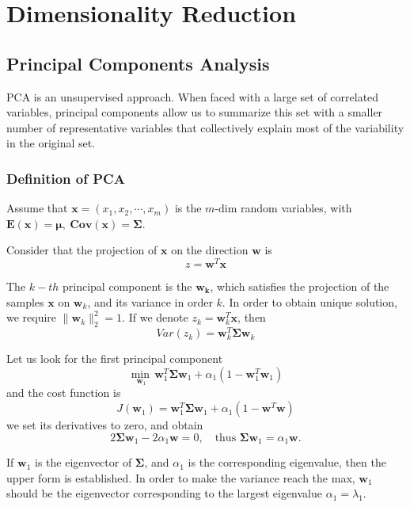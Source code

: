 \chapter{Dimensionality Reduction}




\newpage
\section{Principal Components Analysis}
PCA is an unsupervised approach. When faced with a large set of correlated variables, principal components allow us to summarize this set with a smaller number of representative variables that collectively explain most of the variability in the original set.

\subsection{Definition of PCA}
Assume that $\mathbf{x} = (x_1,x_2,\cdots,x_m)$ is the $m$-dim random variables, with $\mathbf{E}(\mathbf{x}) = \mathbf{\mu},~\mathbf{Cov}(\mathbf{x}) = \mathbf{\Sigma}$. 

Consider that the projection of $\mathbf{x}$ on the direction $\mathbf{w}$ is
\[
	z = \mathbf{w}^T \mathbf{x}
\]

The $k-th$ principal component is the $\mathbf{w_k}$, which satisfies the projection of the samples $\mathbf{x}$ on $\mathbf{w}_k$, and its variance in order $k$. In order to obtain unique solution, we require $\|\mathbf{w}_k\|_2^2 = 1$. If we denote $z_k = \mathbf{w}_k^T\mathbf{x}$, then
\[
	Var(z_k) = \mathbf{w}_k^T \mathbf{\Sigma} \mathbf{w}_k
\]

Let us look for the first principal component
\[
	\underset{\mathbf{w}_1}{\min\,} \mathbf{w}_1^T \mathbf{\Sigma} \mathbf{w}_1 + \alpha_1(1-\mathbf{w}_1^T\mathbf{w}_1 )
\]
and the cost function is 
\[
	J(\mathbf{w}_1) = \mathbf{w}_1^T \mathbf{\Sigma} \mathbf{w}_1 + \alpha_1(1-\mathbf{w}^T\mathbf{w} )
\]
we set its derivatives to zero, and obtain 
\[
	2\mathbf{\Sigma} \mathbf{w}_1 - 2\alpha_1\mathbf{w} = 0,\quad \text{thus } \mathbf{\Sigma} \mathbf{w}_1 = \alpha_1\mathbf{w}.
\]

\noindent If $\mathbf{w}_1$ is the eigenvector of $\mathbf{\Sigma}$, and $\alpha_1$ is the corresponding eigenvalue, then the upper form is established. In order to make the variance reach the max, $\mathbf{w}_1$ should be the eigenvector corresponding to the largest eigenvalue $\alpha_1 = \lambda_1$.

